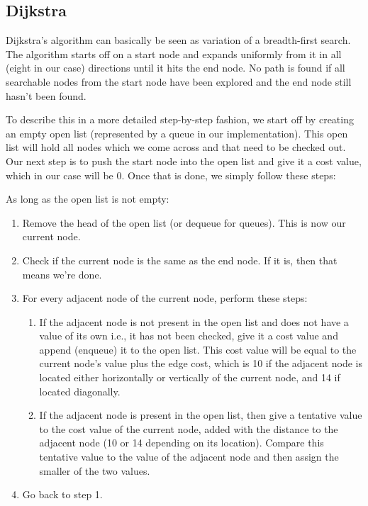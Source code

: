 \documentclass[12pt, a4paper]{article}
\begin{document}

\subsection{Dijkstra}


Dijkstra's algorithm can basically be seen as variation of a breadth-first search. The algorithm starts off
on a start node and expands uniformly from it in all (eight in our case) directions until it hits
the end node. No path is found if all searchable nodes from the start node have been explored and
the end node still hasn't been found.

To describe this in a more detailed step-by-step fashion, we start off by creating an empty
open list (represented by a queue \cite{lecture28} in our implementation).
This open list will hold all nodes which we come across and that need to be checked out.
Our next step is to push the start node into the open list and give it a cost value, which
in our case will be 0. Once that is done, we simply follow these steps:

As long as the open list is not empty:

\begin{enumerate}
	\item Remove the head of the open list (or dequeue for queues). This is now
	our current node.
	\item Check if the current node is the same as the end node. If it is, then
	that means we're done.
	\item For every adjacent node of the current node, perform these steps:
	\begin{enumerate}
		\item If the adjacent node is not present in the open list and does not
		have a value of its own i.e., it has not been checked, give it a cost
		value and append (enqueue) it to the open list. This cost value will be
		equal to the current node's value plus the edge cost, which is 10 if the
		adjacent node is located either horizontally or vertically of the current
		node, and 14 if located diagonally.
		\item If the adjacent node is present in the open list, then give a
		tentative value to the cost value of the current node, added with the
		distance to the adjacent node (10 or 14 depending on its location).
		Compare this tentative value to the value of the adjacent node and then
		assign the smaller of the two values.
	\end{enumerate}
	\item Go back to step 1.
\end{enumerate}
\end{document}
